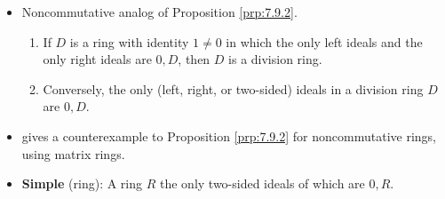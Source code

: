 \documentclass[../notes.tex]{subfiles}
\begin{document}
\begin{itemize}
\begin{proposition}
\begin{enumerate}[ref={\theproposition(\arabic*)}]
            \item \label{prp:7.9.1}$I=R$ iff $I$ contains a unit.
            \begin{proof}
                Given.
            \end{proof}
            \item \label{prp:7.9.2}If $R$ is commutative, then $R$ is a field iff its only ideals are 0 and $R$.
            \begin{proof}
                Given (see Lectures 2.2 and 2.3).
            \end{proof}
        \end{enumerate}
    \end{proposition}
    \begin{corollary}\label{cly:7.10}
        If $R$ is a field, then any nonzero ring homomorphism from $R$ into another ring is an injection.
        \begin{proof}
            Let $S$ be a ring for which there exists a nonzero ring homomorphism $\varphi:R\to S$\footnote{Not any ring can be $S$; for instance, there exists no nonzero \emph{ring homomorphism} $\varphi:\R\to\Z$. So don't worry; it's not like this corollary implies that there is an injection from $\R$ to $\Z$.}. To prove that $\varphi$ is an injection, it will suffice to show that $\ker\varphi=\{0\}$. Since $\varphi$ is a ring homomorphism, $\ker\varphi$ is an ideal. Since $\varphi$ is nonzero, $\ker\varphi\subsetneq R$. Thus, since the only ideals of $R$ a field are $0,R$ by Proposition \ref{prp:7.9.2}, $\ker\varphi=\{0\}$, as desired.
        \end{proof}
    \end{corollary}
    \item Noncommutative analog of Proposition \ref{prp:7.9.2}.
    \begin{enumerate}
        \item If $D$ is a ring with identity $1\neq 0$ in which the only left ideals and the only right ideals are $0,D$, then $D$ is a division ring.
        \item Conversely, the only (left, right, or two-sided) ideals in a division ring $D$ are $0,D$.
    \end{enumerate}
    \item \textcite{bib:DummitFoote} gives a counterexample to Proposition \ref{prp:7.9.2} for noncommutative rings, using matrix rings.
    \item \textbf{Simple} (ring): A ring $R$ the only two-sided ideals of which are $0,R$.
    \begin{itemize}

\end{itemize}
\end{itemize}
\end{document}
